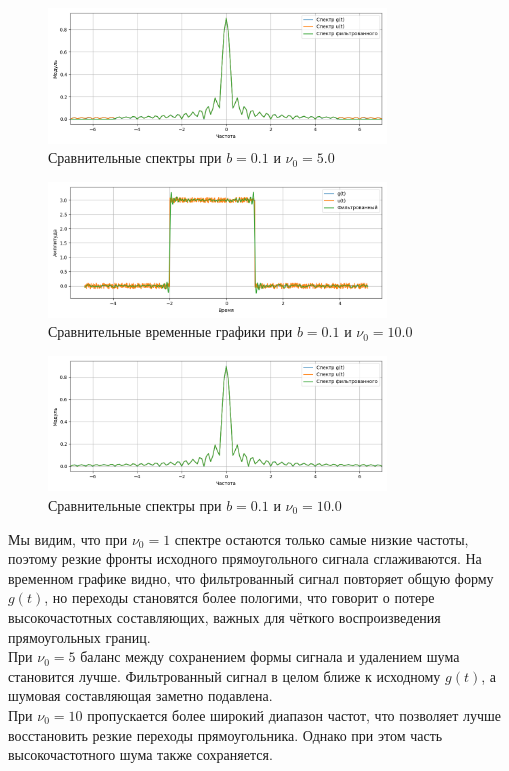\documentclass[a4paper]{article}
\begin{document}
\begin{figure}[H]
    \centering
    \includegraphics[width=0.8\textwidth]{src/lpf/spec_0.1_5.0.png}
    \caption{Сравнительные спектры при $b=0.1$ и $\nu_0=5.0$}
\end{figure}
\begin{figure}[H]
    \centering
    \includegraphics[width=0.8\textwidth]{src/lpf/time_0.1_10.0.png}
    \caption{Сравнительные временные графики при $b=0.1$ и $\nu_0=10.0$}
\end{figure}
\begin{figure}[H]
    \centering
    \includegraphics[width=0.8\textwidth]{src/lpf/spec_0.1_10.0.png}
    \caption{Сравнительные спектры при $b=0.1$ и $\nu_0=10.0$}
\end{figure}
\noindent
Мы видим, что при $\nu_0=1$  спектре остаются только самые низкие частоты, поэтому резкие фронты исходного прямоугольного сигнала сглаживаются. На временном графике видно, что фильтрованный сигнал повторяет общую форму $g(t)$, но переходы становятся более пологими, что говорит о потере высокочастотных составляющих, важных для чёткого воспроизведения прямоугольных границ. \\ [0.5em]
При $\nu_0=5$ баланс между сохранением формы сигнала и удалением шума становится лучше. Фильтрованный сигнал в целом ближе к исходному $g(t)$, а шумовая составляющая заметно подавлена. \\ [0.5em]
При $\nu_0=10$ пропускается более широкий диапазон частот, что позволяет лучше восстановить резкие переходы прямоугольника. Однако при этом часть высокочастотного шума также сохраняется.
\end{document}
